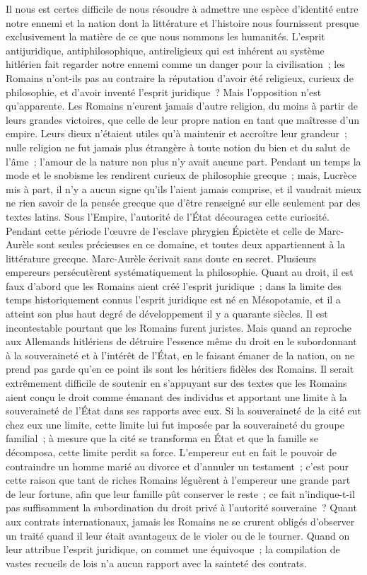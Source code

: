 \documentclass[french,twoside]{book} %
\begin{document}
Il nous est certes difficile de nous résoudre à admettre une espèce d'identité entre notre ennemi et la nation dont la littérature et l'histoire nous fournissent presque exclusivement la matière de ce que nous nommons les humanités. L'esprit antijuridique, antiphilosophique, antireligieux qui est inhé­rent au système hitlérien fait regarder notre ennemi comme un danger pour la civilisation ; les Romains n'ont-ils pas au contraire la réputation d'avoir été religieux, curieux de philosophie, et d'avoir inventé l'esprit juridique ? Mais l'opposition n'est qu'apparente. Les Romains n'eurent jamais d'autre religion, du moins à partir de leurs grandes victoires, que celle de leur propre nation en tant que maîtresse d'un empire. Leurs dieux n'étaient utiles qu'à maintenir et accroître leur grandeur ; nulle religion ne fut jamais plus étrangère à toute notion du bien et du salut de l'âme ; l'amour de la nature non plus n'y avait aucune part. Pendant un temps la mode et le snobisme les rendirent curieux de philosophie grecque ; mais, Lucrèce mis à part, il n'y a aucun signe qu'ils l'aient jamais comprise, et il vaudrait mieux ne rien savoir de la pensée grec­que que d'être renseigné sur elle seulement par des textes latins. Sous l'Empire, l'autorité de l'État découragea cette curiosité. Pendant cette période l'œuvre de l'esclave phrygien Épictète et celle de Marc-Aurèle sont seules précieuses en ce domaine, et toutes deux appartiennent à la littérature grecque. Marc-Aurèle écrivait sans doute en secret. Plusieurs empereurs persécutèrent systématiquement la philosophie. Quant au droit, il est faux d'abord que les Romains aient créé l'esprit juridique ; dans la limite des temps historiquement connus l'esprit juridique est né en Mésopotamie, et il a atteint son plus haut degré de développement il y a quarante siècles. Il est incontestable pourtant que les Romains furent juristes. Mais quand an reproche aux Allemands hitlé­riens de détruire l'essence même du droit en le subordonnant à la souveraineté et à l'intérêt de l'État, en le faisant émaner de la nation, on ne prend pas garde qu'en ce point ils sont les héritiers fidèles des Romains. Il serait extrêmement difficile de soutenir en s'appuyant sur des textes que les Romains aient conçu le droit comme émanant des individus et apportant une limite à la souveraineté de l'État dans ses rapports avec eux. Si la souveraineté de la cité eut chez eux une limite, cette limite lui fut imposée par la souveraineté du groupe familial ; à mesure que la cité se transforma en État et que la famille se décomposa, cette limite perdit sa force. L'empereur eut en fait le pouvoir de contraindre un homme marié au divorce et d'annuler un testament ; c'est pour cette raison que tant de riches Romains léguèrent à l'empereur une grande part de leur fortune, afin que leur famille pût conserver le reste ; ce fait n'indique-t-il pas suffisam­ment la subordination du droit privé à l'autorité souveraine ? Quant aux contrats internationaux, jamais les Romains ne se crurent obligés d'observer un traité quand il leur était avantageux de le violer ou de le tourner. Quand on leur attribue l'esprit juridique, on commet une équivoque ; la compilation de vastes recueils de lois n'a aucun rapport avec la sainteté des contrats.\par
\end{document}
